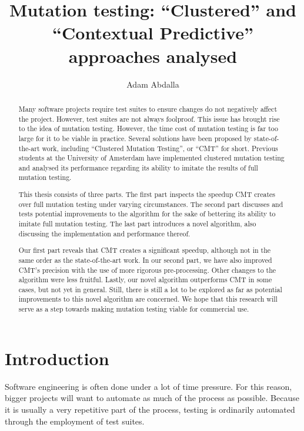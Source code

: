 \documentclass[twoside]{uva-inf-bachelor-thesis}
\title{Mutation testing: ``Clustered'' and ``Contextual Predictive'' approaches analysed}
\author{Adam Abdalla}
\begin{document}
\maketitle

\begin{abstract}
Many software projects require test suites to ensure changes do not negatively affect the project. However, test suites are not always foolproof. This issue has brought rise to the idea of mutation testing. However, the time cost of mutation testing is far too large for it to be viable in practice. Several solutions have been proposed by state-of-the-art work, including ``Clustered Mutation Testing'', or ``CMT'' for short. Previous students at the University of Amsterdam have implemented clustered mutation testing and analysed its performance regarding its ability to imitate the results of full mutation testing.

This thesis consists of three parts. The first part inspects the speedup CMT creates over full mutation testing under varying circumstances. The second part discusses and tests potential improvements to the algorithm for the sake of bettering its ability to imitate full mutation testing. The last part introduces a novel algorithm, also discussing the implementation and performance thereof. 

Our first part reveals that CMT creates a significant speedup, although not in the same order as the state-of-the-art work. In our second part, we have also improved CMT's precision with the use of more rigorous pre-processing. Other changes to the algorithm were less fruitful. Lastly, our novel algorithm outperforms CMT in some cases, but not yet in general. Still, there is still a lot to be explored as far as potential improvements to this novel algorithm are concerned. We hope that this research will serve as a step towards making mutation testing viable for commercial use.
\end{abstract}

\tableofcontents

\chapter{Introduction}
Software engineering is often done under a lot of time pressure. For this reason, bigger projects will want to automate as much of the process as possible. Because it is usually a very repetitive part of the process, testing is ordinarily automated through the employment of test suites.
\end{document}
